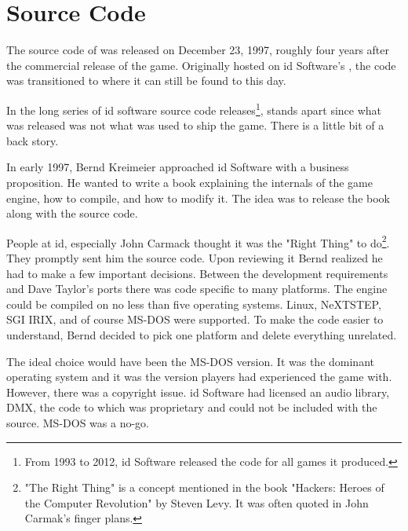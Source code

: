 \section{Source Code}
The source code of \doom{} was released on December 23, 1997, roughly four years after the commercial release of the game. 
Originally hosted on id Software's , the code was transitioned to  where it can still be found to this day.\\
\par
{}
\par
 In the long series of id software source code releases\footnote{From 1993 to 2012, id Software released the code for all games it produced.}, \doom{} stands apart since what was released was not what was used to ship the game. There is a little bit of a back story.\\
 \par
 In early 1997, Bernd Kreimeier approached id Software with a business proposition. He wanted to write a book explaining the internals of the game engine, how to compile, and how to modify it. The idea was to release the book along with the source code.\\
 \par
  People at id, especially John Carmack thought it was the "Right Thing" to do\footnote{"The Right Thing" is a concept mentioned in the book "Hackers: Heroes of the Computer Revolution" by Steven Levy. It was often quoted in John Carmak's finger plans.}. They promptly sent him the source code. Upon reviewing it Bernd realized he had to make a few important decisions. Between the development requirements and Dave Taylor's ports there was code specific to many platforms. The engine could be compiled on no less than five operating systems. Linux, NeXTSTEP, SGI IRIX, and of course MS-DOS were supported. To make the code easier to understand, Bernd decided to pick one platform and delete everything unrelated.\\
  \par
  The ideal choice would have been the MS-DOS version. It was the dominant operating system and it was the version players had experienced the game with. However, there was a copyright issue. id Software had licensed an audio library, DMX, the code to which was proprietary and could not be included with the source. MS-DOS was a no-go.\\
